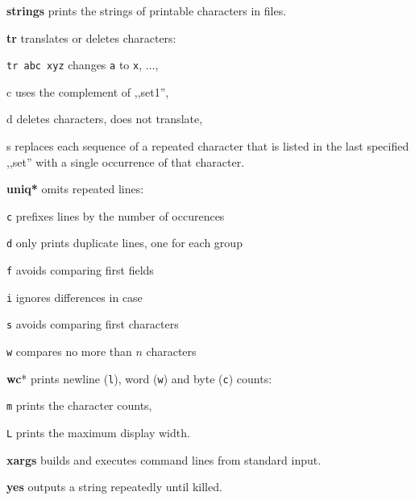 \textbf{strings} prints the strings of printable characters in files.

\begin{enumx}
	\item [\cmd] \textbf{tr} translates or deletes characters:
	\item \texttt{tr abc xyz} changes \texttt{a} to \texttt{x}, $\ldots$,
	\item [c] uses the complement of ,,set1'',
	\item [d] deletes characters, does not translate,
	\item [s] replaces each sequence of a repeated character that is listed 
	in the last specified ,,set'' with a single occurrence of that character.
\end{enumx}

\begin{enumx}
	\item [\cmd] \textbf{uniq*} omits repeated lines:
	\item [\texttt{c}] prefixes lines by the number of occurences
	\item [\texttt{d}] only prints duplicate lines, one for each group
	\item [\texttt{f}] avoids comparing first fields
	\item [\texttt{i}] ignores differences in case
	\item [\texttt{s}] avoids comparing first characters
	\item [\texttt{w}] compares no more than $n$ characters
\end{enumx}


\begin{enumx}
	\item [\cmd] \textbf{wc}* prints newline (\texttt{l}), word (\texttt{w}) and byte (\texttt{c}) counts:
	\item [\texttt{m}] prints the character counts,
	\item [\texttt{L}] prints the maximum display width.
\end{enumx}

\begin{enumx}
	\item [\cmd] \textbf{xargs} builds and executes command lines from standard input.
\end{enumx}

\textbf{yes} outputs a string repeatedly until killed.
